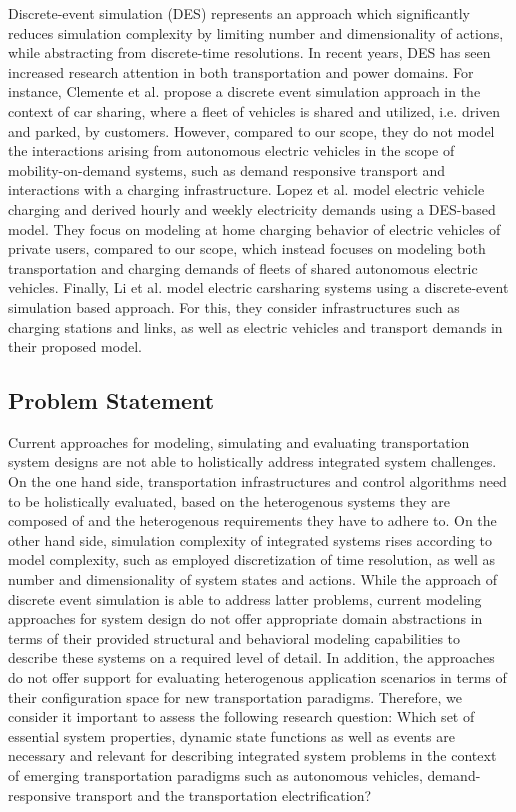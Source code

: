 \documentclass[graybox]{svmult}
\begin{document}
Discrete-event simulation (DES) represents an approach which significantly reduces simulation complexity by limiting number and dimensionality of actions, while abstracting from discrete-time resolutions. In recent years, DES has seen increased research attention in both transportation \cite{clemente2013discrete, fanti2017fleet} and power \cite{lebeau2013implementing, ferro2019predictive, lopez2021modeling} domains. For instance, Clemente et al. \cite{clemente2013discrete} propose a discrete event simulation approach in the context of car sharing, where a fleet of vehicles is shared and utilized, i.e. driven and parked, by customers. However, compared to our scope, they do not model the interactions arising from autonomous electric vehicles in the scope of mobility-on-demand systems, such as demand responsive transport and interactions with a charging infrastructure. Lopez et al. \cite{lopez2021modeling} model electric vehicle charging and derived hourly and weekly electricity demands using a DES-based model. They focus on modeling at home charging behavior of electric vehicles of private users, compared to our scope, which instead focuses on modeling both transportation and charging demands of fleets of shared autonomous electric vehicles. Finally, Li et al. \cite{li2021simulation} model electric carsharing systems using a discrete-event simulation based approach. For this, they consider infrastructures such as charging stations and links, as well as electric vehicles and transport demands in their proposed model.

\subsection{Problem Statement}

Current approaches for modeling, simulating and evaluating transportation system designs are not able to holistically address integrated system challenges. On the one hand side, transportation infrastructures and control algorithms need to be holistically evaluated, based on the heterogenous systems they are composed of and the heterogenous requirements they have to adhere to. On the other hand side, simulation complexity of integrated systems rises according to model complexity, such as employed discretization of time resolution, as well as number and dimensionality of system states and actions. While the approach of discrete event simulation is able to address latter problems, current modeling approaches for system design do not offer appropriate domain abstractions in terms of their provided structural and behavioral modeling capabilities to describe these systems on a required level of detail. In addition, the approaches do not offer support for evaluating heterogenous application scenarios in terms of their configuration space for new transportation paradigms. Therefore, we consider it important to assess the following research question: Which set of essential system properties, dynamic state functions as well as events are necessary and relevant for describing integrated system problems in the context of emerging transportation paradigms such as autonomous vehicles, demand-responsive transport and the transportation electrification?
\end{document}
